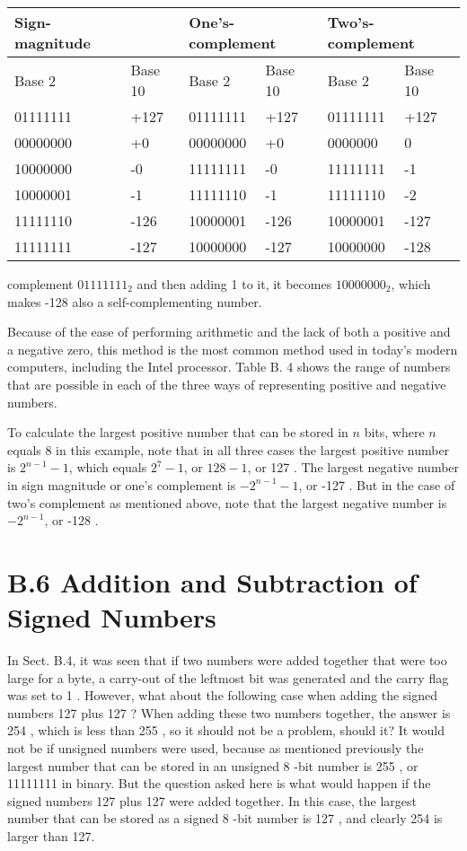 \documentclass[10pt]{article}
\begin{document}
\begin{center}
\begin{tabular}{|l|l|l|l|l|l|}
\hline
Sign-magnitude &  & \multicolumn{2}{|l|}{One's-complement} & \multicolumn{2}{|l|}{Two's-complement} \\
\hline
Base 2 & Base 10 & Base 2 & Base 10 & Base 2 & Base 10 \\
\hline
01111111 & +127 & 01111111 & +127 & 01111111 & +127 \\
\hline
00000000 & +0 & 00000000 & +0 & 0000000 & 0 \\
\hline
10000000 & -0 & 11111111 & -0 & 11111111 & -1 \\
\hline
10000001 & -1 & 11111110 & -1 & 11111110 & -2 \\
\hline
11111110 & -126 & 10000001 & -126 & 10000001 & -127 \\
\hline
11111111 & -127 & 10000000 & -127 & 10000000 & -128 \\
\hline
\end{tabular}
\end{center}

complement $01111111_{2}$ and then adding 1 to it, it becomes $10000000_{2}$, which makes -128 also a self-complementing number.

Because of the ease of performing arithmetic and the lack of both a positive and a negative zero, this method is the most common method used in today's modern computers, including the Intel processor. Table B. 4 shows the range of numbers that are possible in each of the three ways of representing positive and negative numbers.

To calculate the largest positive number that can be stored in $n$ bits, where $n$ equals 8 in this example, note that in all three cases the largest positive number is $2^{n-1}-1$, which equals $2^{7}-1$, or $128-1$, or 127 . The largest negative number in sign magnitude or one's complement is $-2^{n-1}-1$, or -127 . But in the case of two's complement as mentioned above, note that the largest negative number is $-2^{n-1}$, or -128 .

\section*{B.6 Addition and Subtraction of Signed Numbers}
In Sect. B.4, it was seen that if two numbers were added together that were too large for a byte, a carry-out of the leftmost bit was generated and the carry flag was set to 1 . However, what about the following case when adding the signed numbers 127 plus 127 ? When adding these two numbers together, the answer is 254 , which is less than 255 , so it should not be a problem, should it? It would not be if unsigned numbers were used, because as mentioned previously the largest number that can be stored in an unsigned 8 -bit number is 255 , or 11111111 in binary. But the question asked here is what would happen if the signed numbers 127 plus 127 were added together. In this case, the largest number that can be stored as a signed 8 -bit number is 127 , and clearly 254 is larger than 127.
\end{document}
